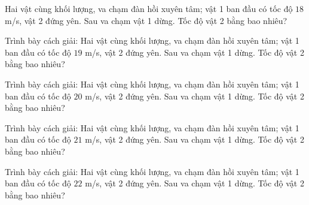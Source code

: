 \begin{ex}
Hai vật cùng khối lượng, va chạm đàn hồi xuyên tâm; vật 1 ban đầu có tốc độ $18$ m/s, vật 2 đứng yên. Sau va chạm vật 1 dừng. Tốc độ vật 2 bằng bao nhiêu?
\end{ex}

\begin{bt}
Trình bày cách giải: Hai vật cùng khối lượng, va chạm đàn hồi xuyên tâm; vật 1 ban đầu có tốc độ $19$ m/s, vật 2 đứng yên. Sau va chạm vật 1 dừng. Tốc độ vật 2 bằng bao nhiêu?
\end{bt}

\begin{bt}
Trình bày cách giải: Hai vật cùng khối lượng, va chạm đàn hồi xuyên tâm; vật 1 ban đầu có tốc độ $20$ m/s, vật 2 đứng yên. Sau va chạm vật 1 dừng. Tốc độ vật 2 bằng bao nhiêu?
\end{bt}

\begin{bt}
Trình bày cách giải: Hai vật cùng khối lượng, va chạm đàn hồi xuyên tâm; vật 1 ban đầu có tốc độ $21$ m/s, vật 2 đứng yên. Sau va chạm vật 1 dừng. Tốc độ vật 2 bằng bao nhiêu?
\end{bt}

\begin{bt}
Trình bày cách giải: Hai vật cùng khối lượng, va chạm đàn hồi xuyên tâm; vật 1 ban đầu có tốc độ $22$ m/s, vật 2 đứng yên. Sau va chạm vật 1 dừng. Tốc độ vật 2 bằng bao nhiêu?
\end{bt}


